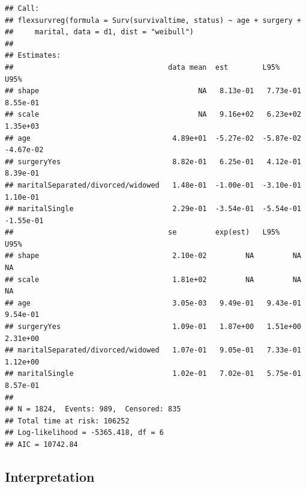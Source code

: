 \documentclass[
  10pt,
]{krantz}
\begin{document}
\begin{verbatim}
## Call:
## flexsurvreg(formula = Surv(survivaltime, status) ~ age + surgery + 
##     marital, data = d1, dist = "weibull")
## 
## Estimates: 
##                                    data mean  est        L95%       U95%     
## shape                                     NA   8.13e-01   7.73e-01   8.55e-01
## scale                                     NA   9.16e+02   6.23e+02   1.35e+03
## age                                 4.89e+01  -5.27e-02  -5.87e-02  -4.67e-02
## surgeryYes                          8.82e-01   6.25e-01   4.12e-01   8.39e-01
## maritalSeparated/divorced/widowed   1.48e-01  -1.00e-01  -3.10e-01   1.10e-01
## maritalSingle                       2.29e-01  -3.54e-01  -5.54e-01  -1.55e-01
##                                    se         exp(est)   L95%       U95%     
## shape                               2.10e-02         NA         NA         NA
## scale                               1.81e+02         NA         NA         NA
## age                                 3.05e-03   9.49e-01   9.43e-01   9.54e-01
## surgeryYes                          1.09e-01   1.87e+00   1.51e+00   2.31e+00
## maritalSeparated/divorced/widowed   1.07e-01   9.05e-01   7.33e-01   1.12e+00
## maritalSingle                       1.02e-01   7.02e-01   5.75e-01   8.57e-01
## 
## N = 1824,  Events: 989,  Censored: 835
## Total time at risk: 106252
## Log-likelihood = -5365.418, df = 6
## AIC = 10742.84
\end{verbatim}

\hypertarget{interpretation-1}{%
\subsection{Interpretation}\label{interpretation-1}}
\end{document}
